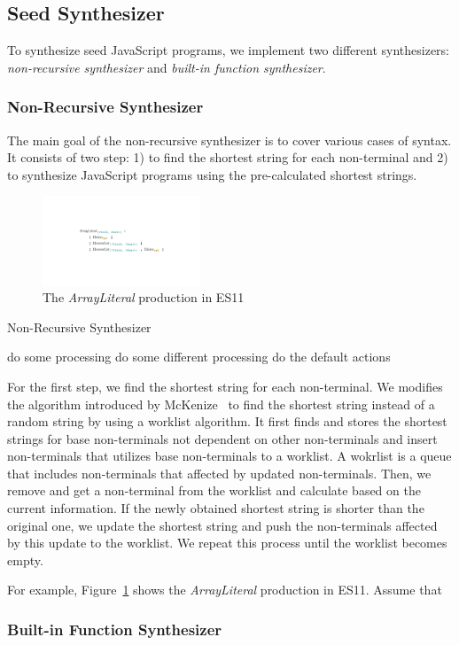 \subsection{Seed Synthesizer}

To synthesize seed JavaScript programs, we implement two different
synthesizers: \textit{non-recursive synthesizer} and \textit{built-in function
synthesizer}.
\newline

\subsubsection{Non-Recursive Synthesizer}

The main goal of the non-recursive synthesizer is to cover various cases of
syntax.  It consists of two step: 1) to find the shortest string for each
non-terminal and 2) to synthesize JavaScript programs using the pre-calculated
shortest strings.

\begin{figure}[t]
  \centering
  \includegraphics[width=0.42\textwidth]{img/syntax-arrayliteral.pdf}
  \caption{The \textit{ArrayLiteral} production in ES11}
  \label{fig:prod-example}
\end{figure}

\begin{algorithm}[t]
  \caption{Non-Recursive Synthesizer}
  \label{alg:non-rec-synthesizer}
  \begin{algorithmic}
    \STATE {}
      \STATE do some processing
      \STATE do some different processing
    \ELSE
      \STATE do the default actions
    \ENDIF
  \end{algorithmic}
\end{algorithm}

For the first step, we find the shortest string for each non-terminal.  We
modifies the algorithm introduced by McKenize~\cite{cfg-gen} to find the
shortest string instead of a random string by using a worklist algorithm.
It first finds and stores the shortest strings for base non-terminals not
dependent on other non-terminals and insert non-terminals that utilizes base
non-terminals to a worklist.  A wokrlist is a queue that includes non-terminals
that affected by updated non-terminals.  Then, we remove and get a non-terminal
from the worklist and calculate based on the current information.  If the newly
obtained shortest string is shorter than the original one, we update the
shortest string and push the non-terminals affected by this update to the
worklist.  We repeat this process until the worklist becomes empty.

For example, Figure~\ref{fig:prod-example} shows the \textit{ArrayLiteral}
production in ES11.  Assume that 



\subsubsection{Built-in Function Synthesizer}

